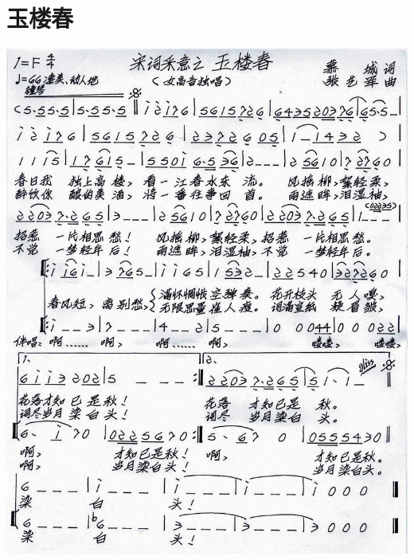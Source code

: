 \documentclass[cn,pad,chinese,chinesefont=nofont]{elegantbook}
\begin{document}
\section{玉楼春}
    \includegraphics[width=\textwidth]{dongxiao/202003231632玉楼春.jpg}
\end{document}
